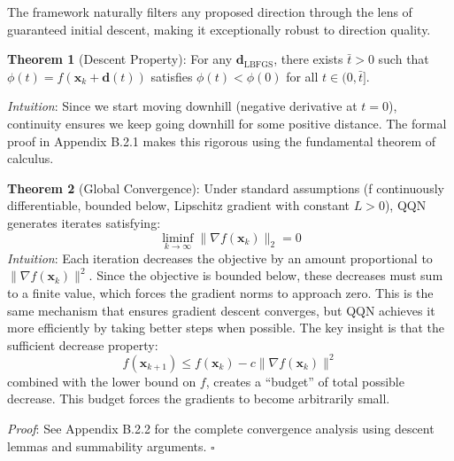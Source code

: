 The framework naturally filters any proposed direction through the lens of guaranteed initial descent, making it exceptionally robust to direction quality.

\textbf{Theorem 1} (Descent Property): For any \(\mathbf{d}_{\text{LBFGS}}\), there exists \(\bar{t} > 0\) such that \(\phi(t) = f(\mathbf{x}_k + \mathbf{d}(t))\) satisfies \(\phi(t) < \phi(0)\) for all \(t \in (0, \bar{t}]\).

\emph{Intuition}: Since we start moving downhill (negative derivative at \(t=0\)), continuity ensures we keep going downhill for some positive distance. The formal proof in Appendix B.2.1 makes this rigorous using the fundamental theorem of calculus.

\textbf{Theorem 2} (Global Convergence): Under standard assumptions (f continuously differentiable, bounded below, Lipschitz gradient with constant \(L > 0\)), QQN generates iterates satisfying:
\[\liminf_{k \to \infty} \|\nabla f(\mathbf{x}_k)\|_2 = 0\]
\emph{Intuition}: Each iteration decreases the objective by an amount proportional to \(\|\nabla f(\mathbf{x}_k)\|^2\). Since the objective is bounded below, these decreases must sum to a finite value, which forces the gradient norms to approach zero. This is the same mechanism that ensures gradient descent converges, but QQN achieves it more efficiently by taking better steps when possible.
The key insight is that the sufficient decrease property:
\[f(\mathbf{x}_{k+1}) \leq f(\mathbf{x}_k) - c\|\nabla f(\mathbf{x}_k)\|^2\]
combined with the lower bound on \(f\), creates a ``budget'' of total possible decrease. This budget forces the gradients to become arbitrarily small.

\emph{Proof}: See Appendix B.2.2 for the complete convergence analysis using descent lemmas and summability arguments. \(\square\)

